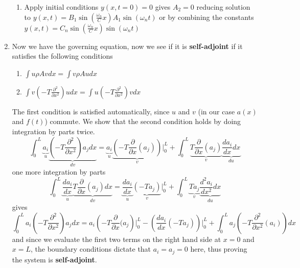 \documentclass[letterpaper,twocolumn,notitlepage]{article}
\begin{document}
\begin{enumerate}
\begin{enumerate}
      \item{Apply initial conditions $y(x,t=0)=0$ gives $A_{2}=0$ reducing solution to $y(x,t)=B_{1}\sin(\frac{\omega_{n}}{C}x) A_{1}\sin(\omega_{n}t)$ or by combining the constants $\boxed{y(x,t)=C_{n}\sin(\frac{\omega_{n}}{C}x)\sin(\omega_{n}t)}$}
    \end{enumerate}
    \item{Now we have the governing equation, now we see if it is \textbf{self-adjoint} if it satisfies the following conditions}
    \begin{enumerate}[label=\roman*)] %
      \setlength{\itemsep}{0pt}
      \item{$\boxed{\int u\rho Avdx=\int v\rho Audx}$}
      \item{$\boxed{\int v\left(-T\frac{\partial^{2}}{\partial x^{2}}\right)udx=\int u\left(-T\frac{\partial^{2}}{\partial x^{2}}\right)vdx}$}
    \end{enumerate}
    The first condition is satisfied automatically, since $u$ and $v$ (in our case $a(x)$ and $f(t)$) commute.
    We show that the second condition holds by doing integration by parts twice.
    \begin{equation*}
      \int_{0}^{L}\underbrace{a_{i}}_{u}\underbrace{\left(-T\frac{\partial^{2}}{\partial x^{2}}\right)a_{j}dx}_{dv}=\underbrace{a_{i}}_{u}\underbrace{\left(-T\frac{\partial}{\partial x}(a_{j})\right)}_{v}\biggr|_{0}^{L}+\int_{0}^{L}\underbrace{T\frac{\partial}{\partial x}(a_{j})}_{v}\underbrace{\frac{da_{i}}{dx}dx}_{du}
    \end{equation*}
    one more integration by parts
    \begin{equation*}
      \int_{0}^{L}\underbrace{\frac{da_{i}}{dx}}_{u}\underbrace{T\frac{\partial}{\partial x}(a_{j})dx}_{dv}=\underbrace{\frac{da_{i}}{dx}}_{u}\underbrace{(-Ta_{j})}_{v}\biggr|_{0}^{L}+\int_{0}^{L}\underbrace{Ta_{j}}_{v}\underbrace{\frac{d^{2}a_{i}}{dx^{2}}dx}_{du}
    \end{equation*}
    gives
    \begin{equation*}
      \int_{0}^{L}a_{i}\left(-T\frac{\partial^{2}}{\partial x^{2}}\right)a_{j}dx=a_{i}\left(-T\frac{\partial}{\partial x}(a_{j}\right)\biggr|_{0}^{L}-\left(\frac{da_{i}}{dx}(-Ta_{j})\right)\biggr|_{0}^{L}+\int_{0}^{L}a_{j}\left(-T\frac{\partial^{2}}{\partial x^{2}}(a_{i})\right)dx
    \end{equation*}
    and since we evaluate the first two terms on the right hand side at $x=0$ and $x=L$, the boundary conditions dictate that $a_{i}=a_{j}=0$ here, thus proving the system is \textbf{self-adjoint}.

\end{enumerate}
\end{document}
